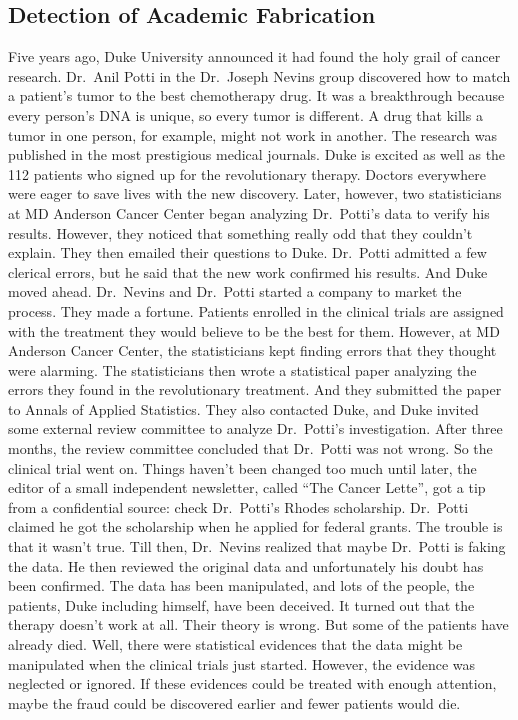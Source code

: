 \documentclass[12pt]{article}
\begin{document}
\subsection{Detection of Academic Fabrication}

Five years ago, Duke University announced it had found the holy grail
of cancer research. Dr.~Anil Potti in the Dr.~Joseph Nevins group
discovered how to match a patient's tumor to the best chemotherapy
drug. It was a breakthrough because every person's DNA is unique, so
every tumor is different. A drug that kills a tumor in one person, for
example, might not work in another. The research was published in the
most prestigious medical journals. Duke is excited as well as the 112
patients who signed up for the revolutionary therapy.  Doctors
everywhere were eager to save lives with the new discovery. Later,
however, two statisticians at MD Anderson Cancer Center began
analyzing Dr.~Potti's data to verify his results. However, they
noticed that something really odd that they couldn't explain. They
then emailed their questions to Duke. Dr.~Potti admitted a few
clerical errors, but he said that the new work confirmed his
results. And Duke moved ahead. Dr.~Nevins and Dr.~Potti started a
company to market the process. They made a fortune. Patients enrolled
in the clinical trials are assigned with the treatment they would
believe to be the best for them. However, at MD Anderson Cancer
Center, the statisticians kept finding errors that they thought were
alarming.  The statisticians then wrote a statistical paper analyzing
the errors they found in the revolutionary treatment. And they
submitted the paper to Annals of Applied Statistics. They also
contacted Duke, and Duke invited some external review committee to
analyze Dr.~Potti's investigation. After three months, the review
committee concluded that Dr.~Potti was not wrong.  So the clinical
trial went on. Things haven't been changed too much until later, the
editor of a small independent newsletter, called ``The Cancer Lette'',
got a tip from a confidential source: check Dr.~Potti's Rhodes
scholarship. Dr.~Potti claimed he got the scholarship when he applied
for federal grants. The trouble is that it wasn't true. Till then,
Dr.~Nevins realized that maybe Dr.~Potti is faking the data. He then
reviewed the original data and unfortunately his doubt has been
confirmed. The data has been manipulated, and lots of the people, the
patients, Duke including himself, have been deceived. It turned out
that the therapy doesn't work at all. Their theory is wrong. But some
of the patients have already died.  Well, there were statistical
evidences that the data might be manipulated when the clinical trials
just started. However, the evidence was neglected or ignored. If these
evidences could be treated with enough attention, maybe the fraud
could be discovered earlier and fewer patients would die.
\end{document}
